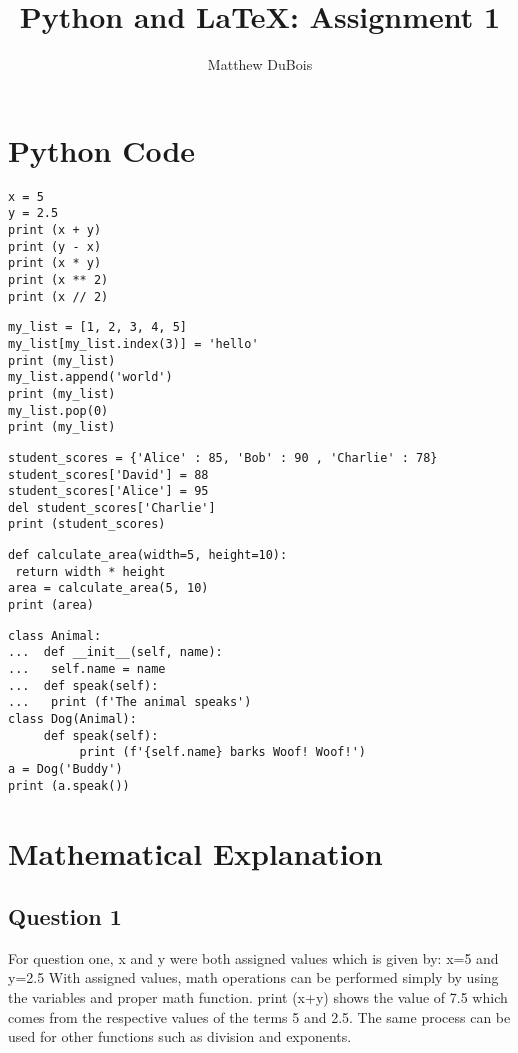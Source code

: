 \documentclass{article}
\begin{document}
\title{Python and LaTeX: Assignment 1}
\author{Matthew DuBois}
\maketitle

\section{Python Code}

\begin{lstlisting}
x = 5
y = 2.5
print (x + y)
print (y - x)
print (x * y)
print (x ** 2)
print (x // 2)
\end{lstlisting}

\begin{lstlisting}
my_list = [1, 2, 3, 4, 5]
my_list[my_list.index(3)] = 'hello'
print (my_list)
my_list.append('world')
print (my_list)
my_list.pop(0)
print (my_list)
\end{lstlisting}

\begin{lstlisting}
student_scores = {'Alice' : 85, 'Bob' : 90 , 'Charlie' : 78}
student_scores['David'] = 88
student_scores['Alice'] = 95
del student_scores['Charlie']
print (student_scores)
\end{lstlisting}

\begin{lstlisting}
def calculate_area(width=5, height=10):
 return width * height
area = calculate_area(5, 10)
print (area)
\end{lstlisting}

\begin{lstlisting}
class Animal:
...  def __init__(self, name):
...   self.name = name
...  def speak(self):
...   print (f'The animal speaks')
class Dog(Animal):
     def speak(self):
          print (f'{self.name} barks Woof! Woof!')
a = Dog('Buddy')
print (a.speak())
\end{lstlisting}

\section{Mathematical Explanation}
\subsection{Question 1}For question one, x and y were both assigned values which is given by:
    x=5 and y=2.5
With assigned values, math operations can be performed simply by using the variables and proper math function.
print (x+y) shows the value of 7.5 which comes from the respective values of the terms 5 and 2.5. The same process can be used for other functions such as division and exponents. 
\end{document}
